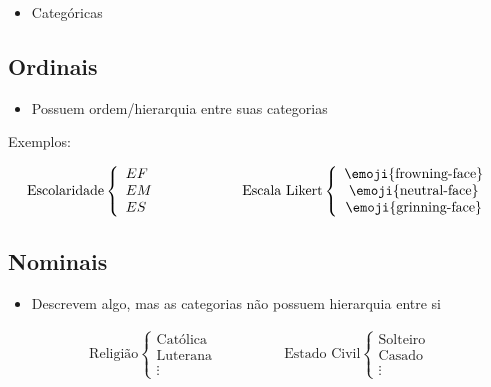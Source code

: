 \documentclass{article}
\begin{document}
\begin{itemize}
    \item Categóricas 
\end{itemize}

\vspace{0.2cm}
\subsection{Ordinais}

\begin{itemize}
    \item Possuem ordem/hierarquia entre suas categorias
\end{itemize}

Exemplos:

\[
\begin{array}{l}
\text{Escolaridade} \left\{ 
    \begin{array}{l}
        EF \\
        EM \\
        ES
    \end{array}
\right.
\hspace{2cm}
\text{Escala Likert} \left\{
    \begin{array}{c}
        \text{\emoji{frowning-face}} \\
        \text{\emoji{neutral-face}}  \\
        \text{\emoji{grinning-face}}
    \end{array}
\right.
\end{array}
\]

\vspace{0.2cm}
\subsection{Nominais}

\begin{itemize}
    \item Descrevem algo, mas as categorias não possuem hierarquia entre si
\end{itemize}

\[
\begin{array}{c}
    \text{Religião} \left\{
        \begin{array}{c}
            \text{Católica} \\
            \text{Luterana} \\
            \vdots
        \end{array}
    \right.
    
    \hspace{2cm}
    \text{Estado Civil} \left\{
        \begin{array}{c}
            \text{Solteiro} \\
            \text{Casado} \\
            \vdots
        \end{array}
    \right.
\end{array}
\]
\end{document}
